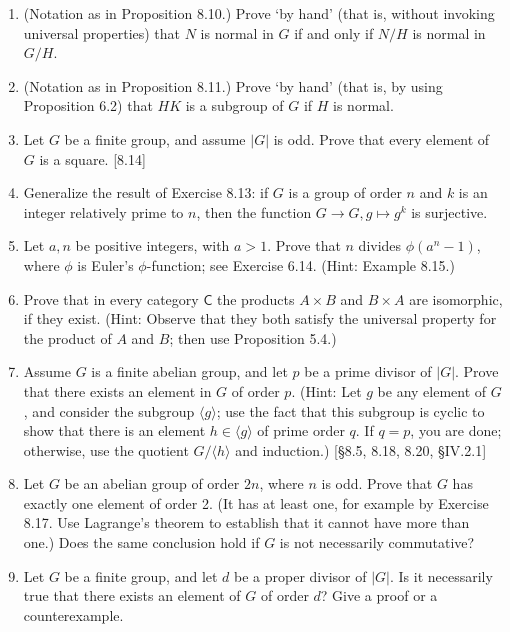 \begin{enumerate}
    \item (Notation as in Proposition 8.10.) Prove `by hand' (that is, without invoking universal properties) that $N$ is normal in $G$ if and only if $N/H$ is normal in $G/H$.

    \item (Notation as in Proposition 8.11.) Prove `by hand' (that is, by using Proposition 6.2) that $HK$ is a subgroup of $G$ if $H$ is normal.

    \item Let $G$ be a finite group, and assume $|G|$ is odd. Prove that every element of $G$ is a square. [8.14]

    \item Generalize the result of Exercise 8.13: if $G$ is a group of order $n$ and $k$ is an integer relatively prime to $n$, then the function $G \to G, g \mapsto g^k$ is surjective.

    \item Let $a, n$ be positive integers, with $a>1$. Prove that $n$ divides $\phi(a^n-1)$, where $\phi$ is Euler's $\phi$-function; see Exercise 6.14. (Hint: Example 8.15.)

    \item Prove that in every category $\mathsf{C}$ the products $A \times B$ and $B \times A$ are isomorphic, if they exist. (Hint: Observe that they both satisfy the universal property for the product of $A$ and $B$; then use Proposition 5.4.)

    \item Assume $G$ is a finite abelian group, and let $p$ be a prime divisor of $|G|$. Prove that there exists an element in $G$ of order $p$. (Hint: Let $g$ be any element of $G$, and consider the subgroup $\langle g \rangle$; use the fact that this subgroup is cyclic to show that there is an element $h \in \langle g \rangle$ of prime order $q$. If $q=p$, you are done; otherwise, use the quotient $G/\langle h \rangle$ and induction.) [\S8.5, 8.18, 8.20, \S IV.2.1]

    \item Let $G$ be an abelian group of order $2n$, where $n$ is odd. Prove that $G$ has exactly one element of order 2. (It has at least one, for example by Exercise 8.17. Use Lagrange's theorem to establish that it cannot have more than one.) Does the same conclusion hold if $G$ is not necessarily commutative?

    \item Let $G$ be a finite group, and let $d$ be a proper divisor of $|G|$. Is it necessarily true that there exists an element of $G$ of order $d$? Give a proof or a counterexample.


\end{enumerate}
